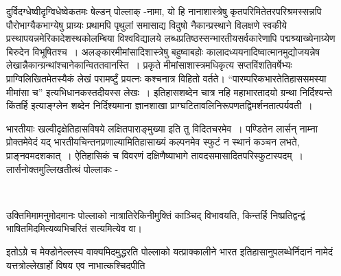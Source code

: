 दुर्विदग्धेष्वीदृग्विधेष्वेकतमः षेल्डन् पोल्लाक् -नामा, यो हि नानाशास्त्रेषु कृतपरिमितेतरपरिश्रमस्सन्नपि पौरोभाग्यैकभाग्येषु प्राग्र्यः प्रथामपि पृथुलां समासाद्य विदुषो नैकान्प्रस्थाने विलक्षणे स्वकीये प्रस्थापयन्नमेरिकादेशस्थकोलम्बिया विश्वविद्यालये लब्धप्रतिष्ठस्सन्भारतीयसर्वकारेणापि पद्मश्र्याख्येनाग्र्येण बिरुदेन विभूषितश्च~। अलङ्कारमीमांसादिशास्त्रेषु बहुष्वाबहोः कालादध्ययनादिष्वात्मानमुद्योजयन्नेष लेखान्नैकान्ग्रन्थांश्चानेकान्विततवानस्ति~। प्रकृते मीमांसाशास्त्रमधिकृत्य सप्तविंशतिवर्षेभ्यः प्राग्विलिखितमेतस्यैकं लेखं परामर्ष्टुं प्रयत्नः कश्चनात्र विहितो वर्तते। “पारम्परिकभारतेतिहाससमस्या मीमांसा च”  इत्यभिधानकस्तदीयस्स लेखः~। इतिहासशब्देन चात्र नहि महाभारतादयो ग्रन्था निर्दिश्यन्ते किंतर्हि  इत्याङ्ग्लेन शब्देन निर्दिश्यमाना ज्ञानशाखा प्राग्घटितावलिनिरूपणतद्विमर्शनतात्पर्यवती~।

भारतीयाः खल्वीदृक्षेतिहासविषये लक्षितपाराङ्मुख्या इति तु विदितचरमेव~। पण्डितेन लार्सन् नाम्ना प्रोक्तमेवेदं यद् भारतीयचिन्तनप्रणाल्यामितिहासाख्यं कल्पनमेव स्फुटं न स्थानं कञ्चन लभते, प्राङ्नवमदशकात्~। ऐतिहासिकं च विवरणं दक्षिणैष्याभागे तावदसमासादितपरिस्फुटास्पदम्~। लार्सनोक्तमुल्लिखतीत्थं पोल्लाकः -

\begin{myquote}

~\hfill {}
\end{myquote}

उक्तिमिमामनुमोदमानः पोल्लाको नात्रातिरेकिनीमुक्तिं काञ्चिद् विभावयति, किन्तर्हि निष्प्रतिद्वन्द्वं भाषितमिदमित्यव्यभिचरितं सत्यमित्येव वा।

इतोऽग्रे च मेक्डोनेल्लस्य वाक्यमिदमुद्धरति पोल्लाको यत्प्राक्कालीने भारत इतिहासानुपलब्धेर्निदानं नामेदं यत्तत्रोल्लेखार्हो विषय एव नाभात्कश्चिदपीति

\begin{myquote}

~\hfill {}
\end{myquote}

